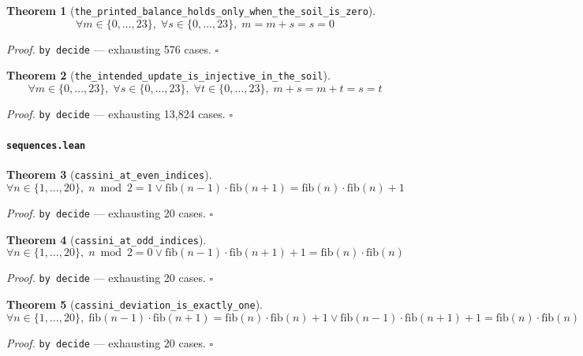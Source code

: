 \documentclass[11pt]{article}
\newtheorem{theorem}{Theorem}[section]
\begin{document}
\begin{theorem}[\texttt{the\_printed\_balance\_holds\_only\_when\_the\_soil\_is\_zero}]
\[ \forall m \in \{0,\dots,23\},\; \forall s \in \{0,\dots,23\},\; m = m + s = s = 0 \]
\end{theorem}
\noindent\emph{Proof.} \texttt{by decide} --- exhausting 576 cases. \hfill$\square$

\begin{theorem}[\texttt{the\_intended\_update\_is\_injective\_in\_the\_soil}]
\[ \forall m \in \{0,\dots,23\},\; \forall s \in \{0,\dots,23\},\; \forall t \in \{0,\dots,23\},\; m + s = m + t = s = t \]
\end{theorem}
\noindent\emph{Proof.} \texttt{by decide} --- exhausting 13,824 cases. \hfill$\square$

\paragraph{\texttt{sequences.lean}}

\begin{theorem}[\texttt{cassini\_at\_even\_indices}]
\[ \forall n \in \{1,\dots,20\},\; n \bmod 2 = 1 \lor \mathrm{fib}\mathopen{}\left(n - 1\right) \cdot \mathrm{fib}\mathopen{}\left(n + 1\right) = \mathrm{fib}\mathopen{}\left(n\right) \cdot \mathrm{fib}\mathopen{}\left(n\right) + 1 \]
\end{theorem}
\noindent\emph{Proof.} \texttt{by decide} --- exhausting 20 cases. \hfill$\square$

\begin{theorem}[\texttt{cassini\_at\_odd\_indices}]
\[ \forall n \in \{1,\dots,20\},\; n \bmod 2 = 0 \lor \mathrm{fib}\mathopen{}\left(n - 1\right) \cdot \mathrm{fib}\mathopen{}\left(n + 1\right) + 1 = \mathrm{fib}\mathopen{}\left(n\right) \cdot \mathrm{fib}\mathopen{}\left(n\right) \]
\end{theorem}
\noindent\emph{Proof.} \texttt{by decide} --- exhausting 20 cases. \hfill$\square$

\begin{theorem}[\texttt{cassini\_deviation\_is\_exactly\_one}]
\[ \forall n \in \{1,\dots,20\},\; \mathrm{fib}\mathopen{}\left(n - 1\right) \cdot \mathrm{fib}\mathopen{}\left(n + 1\right) = \mathrm{fib}\mathopen{}\left(n\right) \cdot \mathrm{fib}\mathopen{}\left(n\right) + 1 \lor \mathrm{fib}\mathopen{}\left(n - 1\right) \cdot \mathrm{fib}\mathopen{}\left(n + 1\right) + 1 = \mathrm{fib}\mathopen{}\left(n\right) \cdot \mathrm{fib}\mathopen{}\left(n\right) \]
\end{theorem}
\noindent\emph{Proof.} \texttt{by decide} --- exhausting 20 cases. \hfill$\square$
\end{document}
